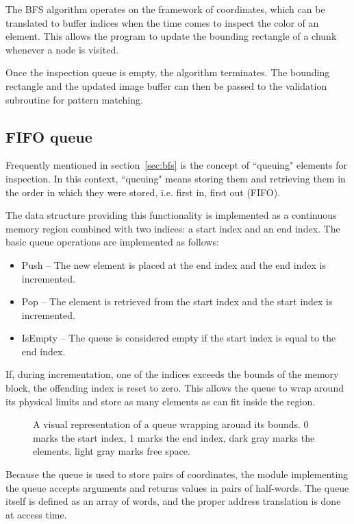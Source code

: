 \documentclass{article}
\begin{document}
	The BFS algorithm operates on the framework of coordinates, which can be
	translated to buffer indices when the time comes to inspect the color of an
	element. This allows the program to update the bounding rectangle of a chunk
	whenever a node is visited.
	
	Once the inspection queue is empty, the algorithm terminates. The bounding
	rectangle and the updated image buffer can then be passed to the validation
	subroutine for pattern matching.
	
	\subsection{FIFO queue}
	
	Frequently mentioned in section~\ref{sec:bfs} is the concept of ``queuing"
	elements for inspection. In this context, ``queuing" means storing them and
	retrieving them in the order in which they were stored, i.e. first in, first
	out (FIFO).
	
	The data structure providing this functionality is implemented as a
	continuous memory region combined with two indices: a start index and an
	end index. The basic queue operations are implemented as follows:
	\begin{itemize}
		\item Push -- The new element is placed at the end index and the end
		index is incremented.
		\item Pop -- The element is retrieved from the start index and the start
		index is incremented.
		\item IsEmpty -- The queue is considered empty if the start index is
		equal to the end index.
	\end{itemize}
	
	If, during incrementation, one of the indices exceeds the bounds of the
	memory block, the offending index is reset to zero. This allows the queue to
	wrap around its physical limits and store as many elements as can fit inside
	the region.
	
	\begin{figure}[h]
		\centering
		\caption{A visual representation of a queue wrapping around its bounds.
		0 marks the start index, 1 marks the end index, dark gray marks the
		elements, light gray marks free space.}
	\end{figure}
	
	Because the queue is used to store pairs of coordinates, the module
	implementing the queue accepts arguments and returns values in pairs of
	half-words. The queue itself is defined as an array of words, and the proper
	address translation is done at access time.
	
\end{document}

